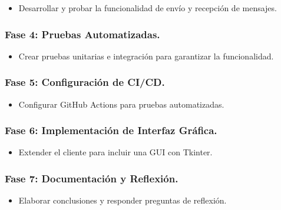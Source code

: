 \documentclass[
  a4paper,
  DIV=11,
  numbers=noendperiod,
  onepage,
  openany]{scrreprt}
\providecommand{\tightlist}{%
  \setlength{\itemsep}{0pt}\setlength{\parskip}{0pt}}\usepackage{longtable,booktabs,array}
\begin{document}
\begin{itemize}
\tightlist
\item
  Desarrollar y probar la funcionalidad de envío y recepción de
  mensajes.
\end{itemize}

\subsubsection{\texorpdfstring{\textbf{Fase 4}: Pruebas
Automatizadas.}{Fase 4: Pruebas Automatizadas.}}\label{fase-4-pruebas-automatizadas.}

\begin{itemize}
\tightlist
\item
  Crear pruebas unitarias e integración para garantizar la
  funcionalidad.
\end{itemize}

\subsubsection{\texorpdfstring{\textbf{Fase 5}: Configuración de
CI/CD.}{Fase 5: Configuración de CI/CD.}}\label{fase-5-configuraciuxf3n-de-cicd.}

\begin{itemize}
\tightlist
\item
  Configurar GitHub Actions para pruebas automatizadas.
\end{itemize}

\subsubsection{Fase 6: Implementación de Interfaz
Gráfica.}\label{fase-6-implementaciuxf3n-de-interfaz-gruxe1fica.}

\begin{itemize}
\tightlist
\item
  Extender el cliente para incluir una GUI con Tkinter.
\end{itemize}

\subsubsection{\texorpdfstring{\textbf{Fase 7}: Documentación y
Reflexión.}{Fase 7: Documentación y Reflexión.}}\label{fase-7-documentaciuxf3n-y-reflexiuxf3n.}

\begin{itemize}
\tightlist
\item
  Elaborar conclusiones y responder preguntas de reflexión.
\end{itemize}
\end{document}

